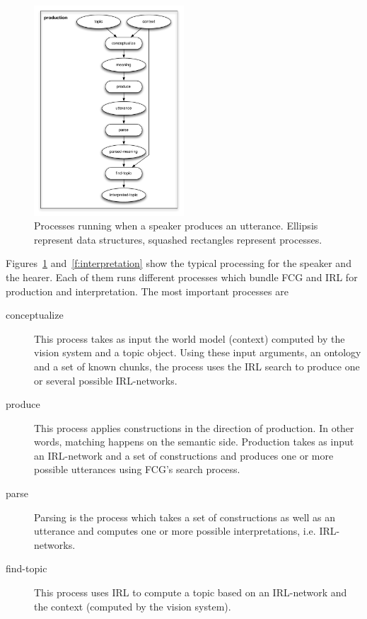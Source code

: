 \begin{figure}
\includegraphics[width=0.5\textwidth]{figs/production}
\caption[Processes running when a speaker produces an utterance]{%
Processes running when a speaker produces an utterance. Ellipsis represent
data structures, squashed rectangles represent processes.}
\label{f:production}
\end{figure}
\textsl{}
Figures~\ref{f:production} and~\ref{f:interpretation} show the typical processing 
for the speaker and the hearer.
Each of them runs different processes which bundle FCG 
and IRL for production and interpretation. The most 
important processes are 
\begin{description}
\item[conceptualize] This process takes as input the world model (context) computed 
by the vision system and a topic object. Using these input 
arguments, an ontology and a set of known chunks, the process uses the 
IRL search to produce one or several possible IRL-networks.
\item[produce] This process applies constructions in the direction of production.
In other words, matching happens on the semantic side. Production takes as input
an IRL-network and a set of constructions and produces one or more possible utterances
using FCG's search process.
\item[parse] Parsing is the process which takes a set of constructions as well as an utterance
and computes one or more possible interpretations, i.e. IRL-networks.
\item[find-topic] This process uses IRL to compute a topic based on 
an IRL-network and the context (computed by the vision system).
\end{description}
